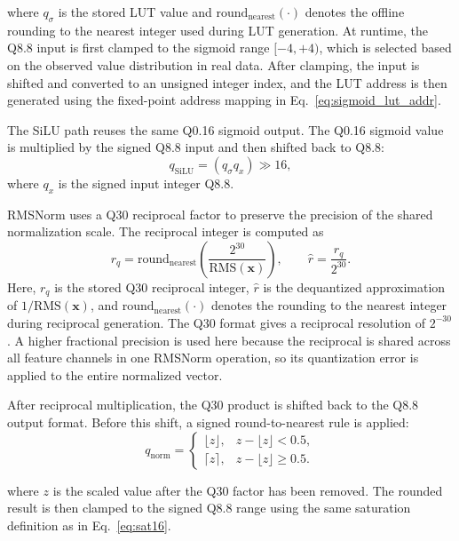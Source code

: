\documentclass[11pt,twoside]{eitExjobb}
\begin{document}
where \(q_{\sigma}\) is the stored LUT value and
\(\mathrm{round}_{\mathrm{nearest}}(\cdot)\) denotes the offline rounding to the
nearest integer used during LUT generation. At runtime, the Q8.8 input is first 
clamped to the sigmoid range \([-4,+4)\), which is selected based on the observed 
value distribution in real data. After clamping, the input is shifted and converted to an unsigned integer index,
and the LUT address is then generated using the fixed-point address
mapping in Eq.~\eqref{eq:sigmoid_lut_addr}.

The SiLU path reuses the same Q0.16 sigmoid output. The Q0.16 sigmoid value is
multiplied by the signed Q8.8 input and then shifted back to Q8.8:
\begin{equation}
q_{\mathrm{SiLU}} =
\left(q_{\sigma} q_x\right) \gg 16 ,
\label{eq:silu_quant}
\end{equation}
where \(q_x\) is the signed input integer Q8.8. 

RMSNorm uses a Q30 reciprocal factor to preserve the precision of the shared
normalization scale. The reciprocal integer is computed as
\begin{equation}
r_q =
\mathrm{round}_{\mathrm{nearest}}
\left(
\frac{2^{30}}{\mathrm{RMS}(\mathbf{x})}
\right),
\qquad
\widehat{r} = \frac{r_q}{2^{30}} .
\label{eq:rms_recip_q30}
\end{equation}
Here, \(r_q\) is the stored Q30 reciprocal integer, \(\widehat{r}\) is the
dequantized approximation of \(1/\mathrm{RMS}(\mathbf{x})\), and
\(\mathrm{round}_{\mathrm{nearest}}(\cdot)\) denotes the rounding to the nearest
integer during reciprocal generation. The Q30 format gives a reciprocal
resolution of \(2^{-30}\). A higher fractional precision is used here because the
reciprocal is shared across all feature channels in one RMSNorm operation, so its
quantization error is applied to the entire normalized vector.

After reciprocal multiplication, the Q30 product is shifted back to the Q8.8
output format. Before this shift, a signed round-to-nearest rule is applied:
\begin{equation}
q_{\mathrm{norm}} =
\begin{cases}
\lfloor z \rfloor, & z-\lfloor z \rfloor < 0.5,\\
\lceil z \rceil, & z-\lfloor z \rfloor \ge 0.5.
\end{cases}
\label{eq:rmsnorm_round_shift}
\end{equation}

where \(z\) is the scaled value after the Q30 factor has been removed. The
rounded result is then clamped to the signed Q8.8 range using the same saturation
definition as in Eq.~\eqref{eq:sat16}.
\end{document}
